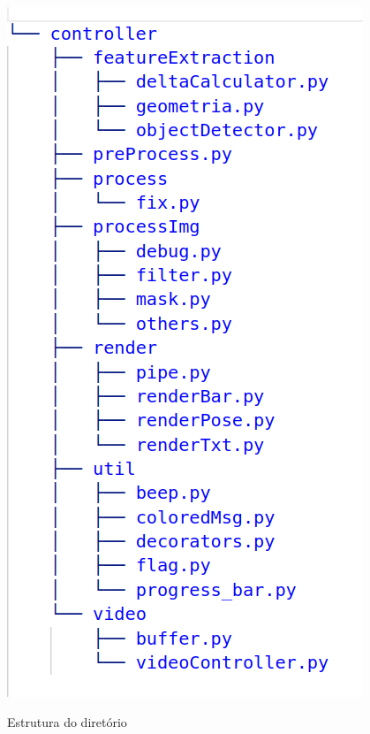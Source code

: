 \begin{figure}[H]
	\centering
    \caption{Estrutura do diretório }
	\includegraphics[scale=0.6]{figuras/diretorios/controller.png}
	\label{fig:controller}
\end{figure}


